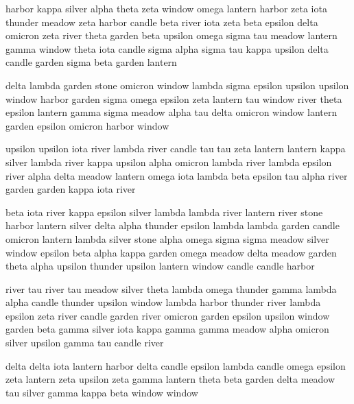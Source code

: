 \documentclass{article}
\begin{document}
\begin{center}
harbor kappa silver alpha theta zeta window omega lantern harbor zeta iota thunder meadow zeta harbor candle beta river iota zeta beta epsilon delta omicron zeta river theta garden beta upsilon omega sigma tau meadow lantern gamma window theta iota candle sigma alpha sigma tau kappa upsilon delta candle garden sigma beta garden lantern
\end{center}

\begin{center}
delta lambda garden stone omicron window lambda sigma epsilon upsilon upsilon window harbor garden sigma omega epsilon zeta lantern tau window river theta epsilon lantern gamma sigma meadow alpha tau delta omicron window lantern garden epsilon omicron harbor window
\end{center}

\begin{center}
upsilon upsilon iota river lambda river candle tau tau zeta lantern lantern kappa silver lambda river kappa upsilon alpha omicron lambda river lambda epsilon river alpha delta meadow lantern omega iota lambda beta epsilon tau alpha river garden garden kappa iota river
\end{center}

\begin{center}
beta iota river kappa epsilon silver lambda lambda river lantern river stone harbor lantern silver delta alpha thunder epsilon lambda lambda garden candle omicron lantern lambda silver stone alpha omega sigma sigma meadow silver window epsilon beta alpha kappa garden omega meadow delta meadow garden theta alpha upsilon thunder upsilon lantern window candle candle harbor
\end{center}

\begin{center}
river tau river tau meadow silver theta lambda omega thunder gamma lambda alpha candle thunder upsilon window lambda harbor thunder river lambda epsilon zeta river candle garden river omicron garden epsilon upsilon window garden beta gamma silver iota kappa gamma gamma meadow alpha omicron silver upsilon gamma tau candle river
\end{center}

\begin{center}
delta delta iota lantern harbor delta candle epsilon lambda candle omega epsilon zeta lantern zeta upsilon zeta gamma lantern theta beta garden delta meadow tau silver gamma kappa beta window window
\end{center}
\end{document}
